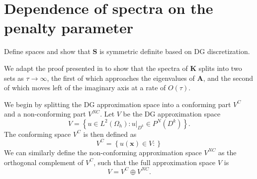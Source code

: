 \documentclass[10pt]{article}
\newcommand{\LRc}[1]{\left\{ #1 \right\}}
\newcommand{\Oh}{\Omega_h}
\newcommand{\note}[1]{{\color{blue}#1}}
\begin{document}
\section{Dependence of spectra on the penalty parameter}

\note{Define spaces and show that $\bm{S}$ is symmetric definite based on DG discretization.}  

We adapt the proof presented in \cite{Warburton20063205} to show that the spectra of $\bm{K}$ splits into two sets as $\tau\rightarrow \infty$, the first of which approaches the eigenvalues of $\bm{A}$, and the second of which moves left of the imaginary axis at a rate of $O(\tau)$.  

We begin by splitting the DG approximation space into a conforming part $V^C$ and a non-conforming part $V^{NC}$.  Let $V$ be the DG approximation space
\[
V = \LRc{ u \in L^2(\Oh) : \left.u\right|_{D^k} \in P^N(D^k)}.  
\]
The conforming space $V^{C}$ is then defined as
\begin{equation}
V^{C} = \LRc{ u(\bm{x}) \in V: }
\label{eq:conf}
\end{equation}
We can similarly define the non-conforming approximation space $V^{NC}$ as the orthogonal complement of $V^{C}$, such that the full approximation space $V$ is 
\[
V = V^C \oplus V^{NC}.  
\]
\end{document}
